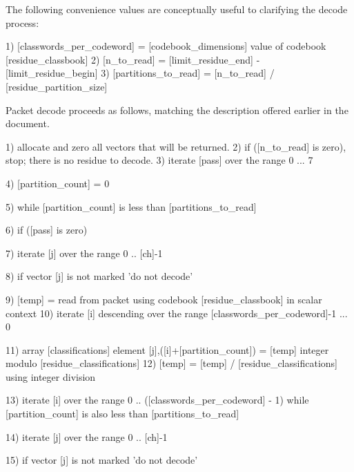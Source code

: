 The following convenience values are conceptually useful to clarifying
the decode process:

\begin{programlisting}
  1) [classwords\_per\_codeword] = [codebook\_dimensions] value of codebook [residue\_classbook]
  2) [n\_to\_read] = [limit\_residue\_end] - [limit\_residue\_begin]
  3) [partitions\_to\_read] = [n\_to\_read] / [residue\_partition\_size]
\end{programlisting}

Packet decode proceeds as follows, matching the description offered earlier in the document.
\begin{programlisting}
  1) allocate and zero all vectors that will be returned.
  2) if ([n\_to\_read] is zero), stop; there is no residue to decode.
  3) iterate [pass] over the range 0 ... 7 {

       4) [partition\_count] = 0

       5) while [partition\_count] is less than [partitions\_to\_read]

            6) if ([pass] is zero) {

                 7) iterate [j] over the range 0 .. [ch]-1 {

                      8) if vector [j] is not marked 'do not decode' {

                           9) [temp] = read from packet using codebook [residue\_classbook] in scalar context
                          10) iterate [i] descending over the range [classwords\_per\_codeword]-1 ... 0 {

                               11) array [classifications] element [j],([i]+[partition\_count]) =
                                   [temp] integer modulo [residue\_classifications]
                               12) [temp] = [temp] / [residue\_classifications] using integer division

                              }

                         }

                    }

               }

           13) iterate [i] over the range 0 .. ([classwords\_per\_codeword] - 1) while [partition\_count]
               is also less than [partitions\_to\_read] {

                 14) iterate [j] over the range 0 .. [ch]-1 {

                      15) if vector [j] is not marked 'do not decode' {

}}}}
\end{programlisting}
